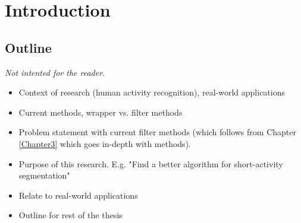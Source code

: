 
\chapter{Introduction}

\label{Chapter1} %



\section{Outline}
\emph{Not intented for the reader.}
\begin{itemize}
  \item Context of research (human activity recognition), real-world applications
  \item Current methods, wrapper vs. filter methods
  \item Problem statement with current filter methods (which follows from Chapter \ref{Chapter3} which goes in-depth with methods).
  \item Purpose of this research. E.g. "Find a better algorithm for short-activity segmentation"
  \item Relate to real-world applications
  \item Outline for rest of the thesis
\end{itemize}